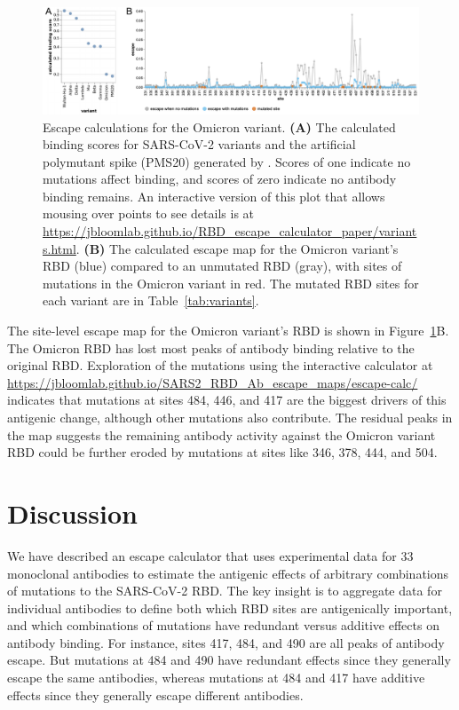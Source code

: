 \documentclass[9pt,twocolumn,twoside]{gsajnl_modified}
\begin{document}
\begin{figure}
\includegraphics[width=\linewidth]{figures/Omicron/Omicron.pdf}
\caption{Escape calculations for the Omicron variant.
{\bf (A)} The calculated binding scores for SARS-CoV-2 variants and the artificial polymutant spike (PMS20) generated by \citet{schmidt2021high}.
Scores of one indicate no mutations affect binding, and scores of zero indicate no antibody binding remains.
An interactive version of this plot that allows mousing over points to see details is at \url{https://jbloomlab.github.io/RBD_escape_calculator_paper/variants.html}.
{\bf (B)} The calculated escape map for the Omicron variant's RBD (blue) compared to an unmutated RBD (gray), with sites of mutations in the Omicron variant in red.
The mutated RBD sites for each variant are in Table~\ref{tab:variants}.
}
\label{fig:Omicron}
\end{figure}

The site-level escape map for the Omicron variant's RBD is shown in Figure~\ref{fig:Omicron}B.
The Omicron RBD has lost most peaks of antibody binding relative to the original RBD.
Exploration of the mutations using the interactive calculator at \url{https://jbloomlab.github.io/SARS2_RBD_Ab_escape_maps/escape-calc/} indicates that mutations at sites 484, 446, and 417 are the biggest drivers of this antigenic change, although other mutations also contribute.
The residual peaks in the map suggests the remaining antibody activity against the Omicron variant RBD could be further eroded by mutations at sites like 346, 378, 444, and 504.

\section{Discussion}
We have described an escape calculator that uses experimental data for 33 monoclonal antibodies to estimate the antigenic effects of arbitrary combinations of mutations to the SARS-CoV-2 RBD.
The key insight is to aggregate data for individual antibodies to define both which RBD sites are antigenically important, and which combinations of mutations have redundant versus additive effects on antibody binding.
For instance, sites 417, 484, and 490 are all peaks of antibody escape.
But mutations at 484 and 490 have redundant effects since they generally escape the same antibodies, whereas mutations at 484 and 417 have additive effects since they generally escape different antibodies.
\end{document}

